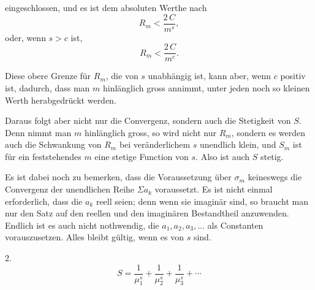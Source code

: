 eingeschlossen, und es ist dem absoluten Werthe nach
\[
R_m < \frac{2\,C}{m^s},
\]
oder, wenn $s > c$ ist,
\[
R_m < \frac{2\,C}{m^c}.
\]

Diese obere Grenze für $R_m$, die von $s$ unabhängig ist, kann aber, wenn $c$ positiv ist, dadurch, dass man $m$ hinlänglich gross annimmt, unter jeden noch so kleinen Werth herabgedrückt werden.

Daraus folgt aber nicht nur die Convergenz, sondern auch die Stetigkeit von $S$. Denn nimmt man $m$ hinlänglich gross, so wird nicht nur $R_m$, sondern es werden auch die Schwankung von $R_m$ bei veränderlichem $s$ unendlich klein, und $S_m$ ist für ein feststehendes $m$ eine stetige Function von $s$. Also ist auch $S$ stetig.

Es ist dabei noch zu bemerken, dass die Voraussetzung über $\sigma_m$ keineswegs die Convergenz der unendlichen Reihe $\Sigma a_k$ voraussetzt. Es ist nicht einmal erforderlich, dass die $a_k$ reell seien; denn wenn sie imaginär sind, so braucht man nur den Satz auf den reellen und den imaginären Bestandtheil anzuwenden. Endlich ist es auch nicht nothwendig, die $a_1, a_2, a_3, \dots$ als Constanten vorauszusetzen. Alles bleibt gültig, wenn es  von $s$ sind.

2. 
\[
S = \frac{1}{\mu_1^s} + \frac{1}{\mu_2^s} + \frac{1}{\mu_3^s} + \cdots
\]
